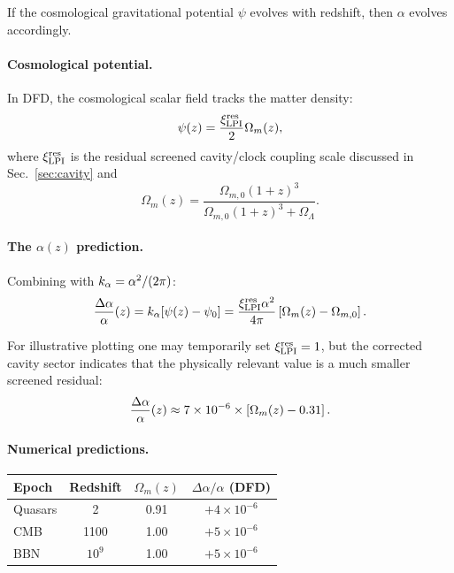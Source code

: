 If the cosmological gravitational potential $\psi$ evolves with redshift, then $\alpha$ evolves accordingly.

\paragraph{Cosmological potential.}
In DFD, the cosmological scalar field tracks the matter density:
\begin{equation}\label{eq:psi-cosmo}
\psi(z) = \frac{\xi_{\rm LPI}^{\rm res}}{2}\Omega_m(z),
\end{equation}
where $\xi_{\rm LPI}^{\rm res}$ is the residual screened cavity/clock coupling scale discussed in Sec.~\ref{sec:cavity} and
\begin{equation}
\Omega_m(z) = \frac{\Omega_{m,0}(1+z)^3}{\Omega_{m,0}(1+z)^3 + \Omega_\Lambda}.
\end{equation}

\paragraph{The $\alpha(z)$ prediction.}
Combining with $k_\alpha = \alpha^2/(2\pi)$:
\begin{equation}\label{eq:alpha-z}
\frac{\Delta\alpha}{\alpha}(z) = k_\alpha[\psi(z) - \psi_0] = \frac{\xi_{\rm LPI}^{\rm res}\alpha^2}{4\pi}\left[\Omega_m(z) - \Omega_{m,0}\right].
\end{equation}

For illustrative plotting one may temporarily set $\xi_{\rm LPI}^{\rm res}=1$, but the corrected cavity sector indicates that the physically relevant value is a much smaller screened residual:
\begin{equation}
\frac{\Delta\alpha}{\alpha}(z) \approx 7 \times 10^{-6} \times \left[\Omega_m(z) - 0.31\right].
\end{equation}

\paragraph{Numerical predictions.}
\begin{center}
\renewcommand{\arraystretch}{1.2}
\begin{tabular}{lccc}
\toprule
Epoch & Redshift & $\Omega_m(z)$ & $\Delta\alpha/\alpha$ (DFD) \\
\midrule
Quasars & 2 & 0.91 & $+4 \times 10^{-6}$ \\
CMB & 1100 & 1.00 & $+5 \times 10^{-6}$ \\
BBN & $10^9$ & 1.00 & $+5 \times 10^{-6}$ \\
\bottomrule
\end{tabular}
\end{center}

